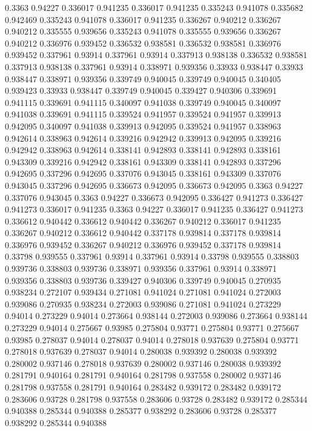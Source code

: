 0.3363 0.94227
0.336017 0.941235
0.336017 0.941235
0.335243 0.941078
0.335682 0.942469
0.335243 0.941078
0.336017 0.941235
0.336267 0.940212
0.336267 0.940212
0.335555 0.939656
0.335243 0.941078
0.335555 0.939656
0.336267 0.940212
0.336976 0.939452
0.336532 0.938581
0.336532 0.938581
0.336976 0.939452
0.337961 0.93914
0.337961 0.93914
0.337913 0.938138
0.336532 0.938581
0.337913 0.938138
0.337961 0.93914
0.338971 0.939356
0.33933 0.938447
0.33933 0.938447
0.338971 0.939356
0.339749 0.940045
0.339749 0.940045
0.340405 0.939423
0.33933 0.938447
0.339749 0.940045
0.339427 0.940306
0.339691 0.941115
0.339691 0.941115
0.340097 0.941038
0.339749 0.940045
0.340097 0.941038
0.339691 0.941115
0.339524 0.941957
0.339524 0.941957
0.339913 0.942095
0.340097 0.941038
0.339913 0.942095
0.339524 0.941957
0.338963 0.942614
0.338963 0.942614
0.339216 0.942942
0.339913 0.942095
0.339216 0.942942
0.338963 0.942614
0.338141 0.942893
0.338141 0.942893
0.338161 0.943309
0.339216 0.942942
0.338161 0.943309
0.338141 0.942893
0.337296 0.942695
0.337296 0.942695
0.337076 0.943045
0.338161 0.943309
0.337076 0.943045
0.337296 0.942695
0.336673 0.942095
0.336673 0.942095
0.3363 0.94227
0.337076 0.943045
0.3363 0.94227
0.336673 0.942095
0.336427 0.941273
0.336427 0.941273
0.336017 0.941235
0.3363 0.94227
0.336017 0.941235
0.336427 0.941273
0.336612 0.940442
0.336612 0.940442
0.336267 0.940212
0.336017 0.941235
0.336267 0.940212
0.336612 0.940442
0.337178 0.939814
0.337178 0.939814
0.336976 0.939452
0.336267 0.940212
0.336976 0.939452
0.337178 0.939814
0.33798 0.939555
0.337961 0.93914
0.337961 0.93914
0.33798 0.939555
0.338803 0.939736
0.338803 0.939736
0.338971 0.939356
0.337961 0.93914
0.338971 0.939356
0.338803 0.939736
0.339427 0.940306
0.339749 0.940045
0.270935 0.938234
0.272107 0.939434
0.271081 0.941024
0.271081 0.941024
0.272003 0.939086
0.270935 0.938234
0.272003 0.939086
0.271081 0.941024
0.273229 0.94014
0.273229 0.94014
0.273664 0.938144
0.272003 0.939086
0.273664 0.938144
0.273229 0.94014
0.275667 0.93985
0.275804 0.93771
0.275804 0.93771
0.275667 0.93985
0.278037 0.94014
0.278037 0.94014
0.278018 0.937639
0.275804 0.93771
0.278018 0.937639
0.278037 0.94014
0.280038 0.939392
0.280038 0.939392
0.280002 0.937146
0.278018 0.937639
0.280002 0.937146
0.280038 0.939392
0.281791 0.940164
0.281791 0.940164
0.281798 0.937558
0.280002 0.937146
0.281798 0.937558
0.281791 0.940164
0.283482 0.939172
0.283482 0.939172
0.283606 0.93728
0.281798 0.937558
0.283606 0.93728
0.283482 0.939172
0.285344 0.940388
0.285344 0.940388
0.285377 0.938292
0.283606 0.93728
0.285377 0.938292
0.285344 0.940388
